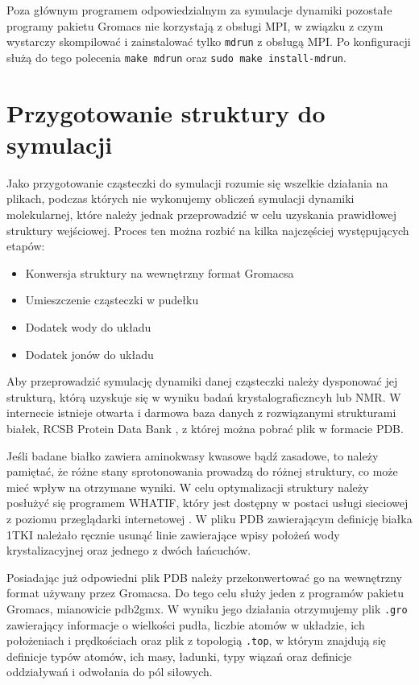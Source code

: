 Poza głównym programem odpowiedzialnym za symulacje dynamiki pozostałe programy pakietu Gromacs nie korzystają z obsługi MPI, w związku z czym wystarczy skompilować i zainstalować tylko \texttt{mdrun} z obsługą MPI. Po konfiguracji służą do tego polecenia \texttt{make mdrun} oraz \texttt{sudo make install-mdrun}.

\section{Przygotowanie struktury do symulacji}
Jako przygotowanie cząsteczki do symulacji rozumie się wszelkie działania na plikach, podczas których nie wykonujemy obliczeń symulacji dynamiki molekularnej, które należy jednak przeprowadzić w celu uzyskania prawidłowej struktury wejściowej. Proces ten można rozbić na kilka najczęściej występujących etapów:
\begin{itemize}
\item Konwersja struktury na wewnętrzny format Gromacsa
\item Umieszczenie cząsteczki w pudełku
\item Dodatek wody do układu
\item Dodatek jonów do układu
\end{itemize}

Aby przeprowadzić symulację dynamiki danej cząsteczki należy dysponować jej strukturą, którą uzyskuje się w wyniku badań krystalograficzncyh lub NMR. W internecie istnieje otwarta i darmowa baza danych z rozwiązanymi strukturami białek, RCSB Protein Data Bank \cite{pdbdb}, z której można pobrać plik w formacie PDB.

Jeśli badane białko zawiera aminokwasy kwasowe bądź zasadowe, to należy pamiętać, że różne stany sprotonowania prowadzą do różnej struktury, co może mieć wpływ na otrzymane wyniki. W celu optymalizacji struktury należy posłużyć się programem WHATIF, który jest dostępny w postaci usługi sieciowej z poziomu przeglądarki internetowej \cite{WHATIF}. W pliku PDB zawierającym definicję białka 1TKI należało ręcznie usunąć linie zawierające wpisy położeń wody krystalizacyjnej oraz jednego z dwóch łańcuchów.

Posiadając już odpowiedni plik PDB należy przekonwertować go na wewnętrzny format używany przez Gromacsa. Do tego celu służy jeden z programów pakietu Gromacs, mianowicie \textsf{pdb2gmx}. W wyniku jego działania otrzymujemy plik \texttt{.gro} zawierający informacje o wielkości pudła, liczbie atomów w układzie, ich położeniach i prędkościach oraz plik z topologią \texttt{.top}, w którym znajdują się definicje typów atomów, ich masy, ładunki, typy wiązań oraz definicje oddziaływań i odwołania do pól siłowych.

